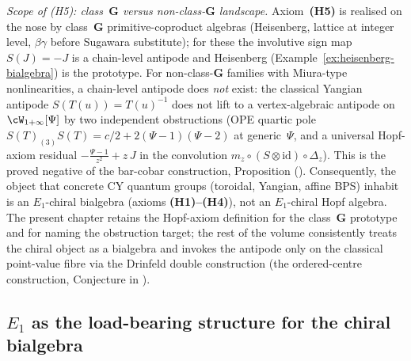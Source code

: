 \begin{remark}
\smallskip
\noindent\emph{Scope of (H5): class~$\mathbf{G}$ versus
non-class-$\mathbf{G}$ landscape.}
Axiom~\textbf{(H5)} is realised on the nose by class~$\mathbf{G}$
primitive-coproduct algebras (Heisenberg, lattice at integer level,
$\beta\gamma$ before Sugawara substitute); for these the
involutive sign map $S(J) = -J$ is a chain-level antipode and
Heisenberg (Example~\ref{ex:heisenberg-bialgebra}) is the prototype.
For non-class-$\mathbf{G}$ families with Miura-type nonlinearities,
a chain-level antipode does \emph{not} exist: the classical Yangian
antipode $S(T(u)) = T(u)^{-1}$ does not lift to a vertex-algebraic
antipode on $\cW_{1+\infty}[\Psi]$ by two independent obstructions
(OPE quartic pole $S(T)_{(3)}S(T) = c/2 + 2(\Psi{-}1)(\Psi{-}2)$ at
generic~$\Psi$, and a universal Hopf-axiom residual
$-\frac{\Psi-1}{z^2} + z\,J$ in the convolution
$m_z \circ (S \otimes \mathrm{id}) \circ \Delta_z$). This is the
proved negative of the bar-cobar construction, Proposition
\textup{\cite{VolI}}
(\cite{VolI}).
Consequently, the object that concrete CY quantum groups
(toroidal, Yangian, affine BPS) inhabit is an
$E_1$-chiral bialgebra (axioms \textbf{(H1)--(H4)}), not an
$E_1$-chiral Hopf algebra. The present chapter retains the
Hopf-axiom definition for the class~$\mathbf{G}$ prototype and for
naming the obstruction target; the rest of the volume consistently
treats the chiral object as a bialgebra and invokes the antipode
only on the classical point-value fibre via the Drinfeld double
construction (the ordered-centre construction, Conjecture
\textup{\cite{VolI}}
in \cite{VolI}).
\end{remark}

\subsection{\texorpdfstring{$E_1$}{E-1} as the load-bearing structure for the chiral bialgebra}
\label{subsec:why-e1-not-einfty}

